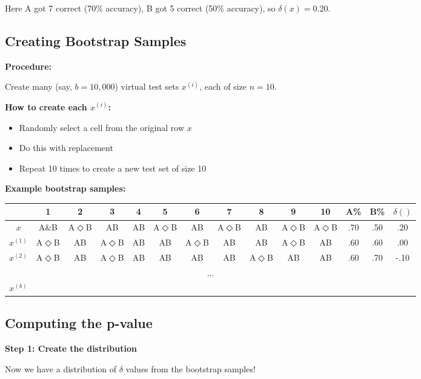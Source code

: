 \documentclass[11pt,a4paper]{article}
\theoremstyle{definition}
\theoremstyle{plain}
\theoremstyle{remark}
\begin{document}
Here A got 7 correct (70\% accuracy), B got 5 correct (50\% accuracy), so $\delta(x) = 0.20$.

\subsection{Creating Bootstrap Samples}

\textbf{Procedure:}

Create many (say, $b = 10{,}000$) virtual test sets $x^{(i)}$, each of size $n = 10$.

\textbf{How to create each $x^{(i)}$:}
\begin{itemize}
    \item Randomly select a cell from the original row $x$
    \item Do this with replacement
    \item Repeat 10 times to create a new test set of size 10
\end{itemize}

\textbf{Example bootstrap samples:}

\begin{center}
\begin{tabular}{|c|c|c|c|c|c|c|c|c|c|c|c|c|c|}
\hline
 & 1 & 2 & 3 & 4 & 5 & 6 & 7 & 8 & 9 & 10 & A\% & B\% & $\delta()$ \\
\hline
$x$ & A\&B & A$\Diamond$B & AB & AB & A$\Diamond$B & AB & A$\Diamond$B & AB & A$\Diamond$B & A$\Diamond$B & .70 & .50 & .20 \\
\hline
$x^{(1)}$ & A$\Diamond$B & AB & A$\Diamond$B & AB & AB & A$\Diamond$B & AB & AB & A$\Diamond$B & AB & .60 & .60 & .00 \\
\hline
$x^{(2)}$ & A$\Diamond$B & AB & A$\Diamond$B & AB & AB & AB & AB & A$\Diamond$B & AB & AB & .60 & .70 & -.10 \\
\hline
\multicolumn{14}{|c|}{...} \\
\hline
$x^{(b)}$ & \multicolumn{13}{c|}{} \\
\hline
\end{tabular}
\end{center}

\subsection{Computing the p-value}

\textbf{Step 1: Create the distribution}

Now we have a distribution of $\delta$ values from the bootstrap samples!
\end{document}
